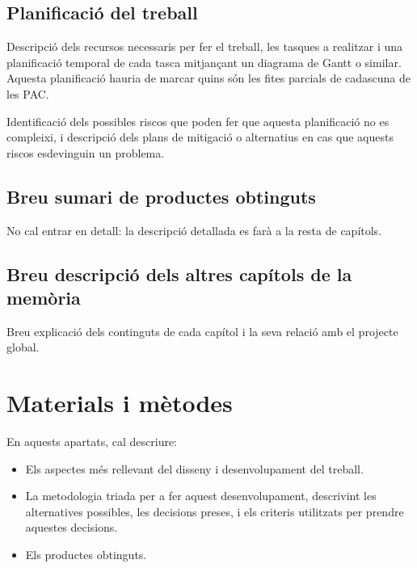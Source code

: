 \documentclass[CAT]{TFUOC}%
\begin{document}
\section{Planificació del treball}

Descripció dels recursos necessaris per fer el treball, les tasques a realitzar i una planificació temporal de cada tasca mitjançant un diagrama de Gantt o similar. Aquesta planificació hauria de marcar quins són les fites parcials de cadascuna de les PAC.

Identificació dels possibles riscos que poden fer que aquesta planificació no es compleixi, i descripció dels plans de mitigació o alternatius en cas que aquests riscos esdevinguin un problema.

\section{Breu sumari de productes obtinguts}

No cal entrar en detall: la descripció detallada es farà a la resta de capítols.


\section{Breu descripció dels altres capítols de la memòria}

Breu explicació dels continguts de cada capítol i la seva relació amb el projecte global.



\chapter{Materials i mètodes}
En aquests apartats, cal descriure:
\begin{itemize}
    \item Els aspectes més rellevant del disseny i desenvolupament del treball.
    \item La metodologia triada per a fer aquest desenvolupament, descrivint les alternatives possibles, les decisions preses, i els criteris utilitzats per prendre aquestes decisions.
    \item Els productes obtinguts.
\end{itemize}
\end{document}
